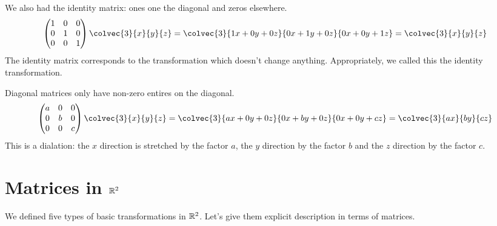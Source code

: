 \documentclass[fleqn,letterpaper]{report}
\begin{document}
\begin{example}
We also had the identity matrix: ones one the diagonal and
zeros elsewhere.
\begin{displaymath}
\left( 
\begin{matrix}
1 & 0 & 0 \\
0 & 1 & 0 \\
0 & 0 & 1 
\end{matrix}
\right)
\colvec{3}{x}{y}{z} 
= 
\colvec{3}
{1x + 0y + 0z}{0x + 1y + 0z}{0x + 0y + 1z}
= 
\colvec{3}{x}{y}{z} 
\end{displaymath}
The identity matrix corresponds to the transformation which
doesn't change anything. Appropriately, we called this the
identity transformation. 
\end{example}

\begin{example}
Diagonal matrices only have non-zero entires on the diagonal.
\begin{displaymath}
\left( 
\begin{matrix}
a & 0 & 0 \\
0 & b & 0 \\
0 & 0 & c 
\end{matrix}
\right)
\colvec{3}{x}{y}{z} 
= 
\colvec{3}
{ax + 0y + 0z}{0x + by + 0z}{0x + 0y + cz}
= 
\colvec{3}{ax}{by}{cz} 
\end{displaymath}
This is a dialation: the $x$ direction is stretched by the
factor $a$, the $y$ direction by the factor $b$ and the $z$
direction by the factor $c$. 
\end{example}

\section{Matrices in $\mathbb{R}^2$}
\label{matrices-in-r2}

We defined five types of basic
transformations in $\mathbb{R}^2$. Let's give them explicit
description in terms of matrices.
\end{document}
